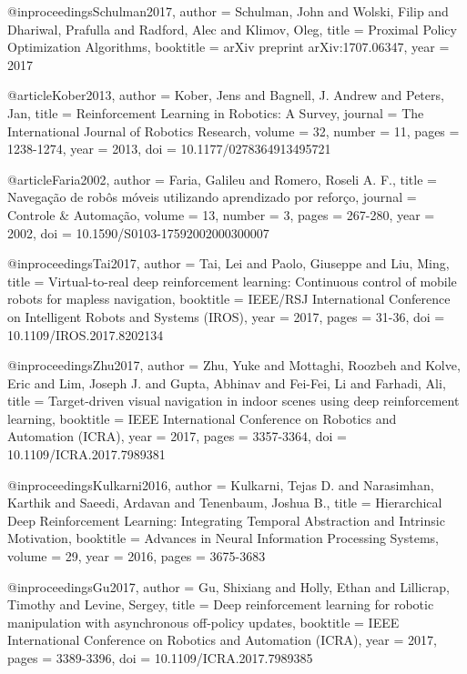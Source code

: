 @inproceedings{Schulman2017,
  author = {Schulman, John and Wolski, Filip and Dhariwal, Prafulla and Radford, Alec and Klimov, Oleg},
  title = {Proximal Policy Optimization Algorithms},
  booktitle = {arXiv preprint arXiv:1707.06347},
  year = {2017}
}

@article{Kober2013,
  author = {Kober, Jens and Bagnell, J. Andrew and Peters, Jan},
  title = {Reinforcement Learning in Robotics: A Survey},
  journal = {The International Journal of Robotics Research},
  volume = {32},
  number = {11},
  pages = {1238-1274},
  year = {2013},
  doi = {10.1177/0278364913495721}
}

@article{Faria2002,
  author = {Faria, Galileu and Romero, Roseli A. F.},
  title = {Navegação de robôs móveis utilizando aprendizado por reforço},
  journal = {Controle \& Automação},
  volume = {13},
  number = {3},
  pages = {267-280},
  year = {2002},
  doi = {10.1590/S0103-17592002000300007}
}

@inproceedings{Tai2017,
  author = {Tai, Lei and Paolo, Giuseppe and Liu, Ming},
  title = {Virtual-to-real deep reinforcement learning: Continuous control of mobile robots for mapless navigation},
  booktitle = {IEEE/RSJ International Conference on Intelligent Robots and Systems (IROS)},
  year = {2017},
  pages = {31-36},
  doi = {10.1109/IROS.2017.8202134}
}

@inproceedings{Zhu2017,
  author = {Zhu, Yuke and Mottaghi, Roozbeh and Kolve, Eric and Lim, Joseph J. and Gupta, Abhinav and Fei-Fei, Li and Farhadi, Ali},
  title = {Target-driven visual navigation in indoor scenes using deep reinforcement learning},
  booktitle = {IEEE International Conference on Robotics and Automation (ICRA)},
  year = {2017},
  pages = {3357-3364},
  doi = {10.1109/ICRA.2017.7989381}
}

@inproceedings{Kulkarni2016,
  author = {Kulkarni, Tejas D. and Narasimhan, Karthik and Saeedi, Ardavan and Tenenbaum, Joshua B.},
  title = {Hierarchical Deep Reinforcement Learning: Integrating Temporal Abstraction and Intrinsic Motivation},
  booktitle = {Advances in Neural Information Processing Systems},
  volume = {29},
  year = {2016},
  pages = {3675-3683}
}

@inproceedings{Gu2017,
  author = {Gu, Shixiang and Holly, Ethan and Lillicrap, Timothy and Levine, Sergey},
  title = {Deep reinforcement learning for robotic manipulation with asynchronous off-policy updates},
  booktitle = {IEEE International Conference on Robotics and Automation (ICRA)},
  year = {2017},
  pages = {3389-3396},
  doi = {10.1109/ICRA.2017.7989385}
}

